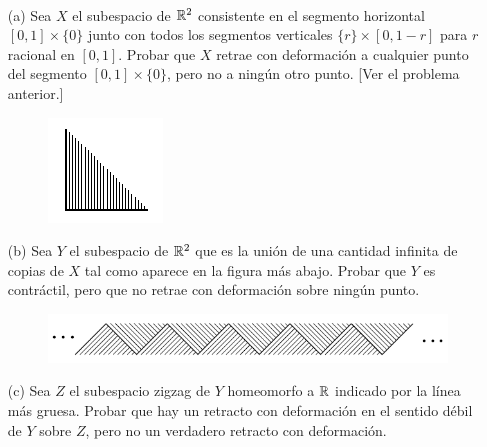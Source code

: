 \documentclass[twoside]{article}
\begin{document}
\begin{ejercicio}{0.6}\
\begin{enumerate}

\item[(a)] Sea $X$ el subespacio de $\mathbb{R}^2$ consistente en el segmento horizontal $[0,1]\times\{0\}$ junto con todos los segmentos verticales $\{r\}\times[0,1-r]$ para $r$ racional en $[0,1]$. Probar que $X$ retrae con deformación a cualquier punto del segmento $[0,1]\times\{0\}$, pero no a ningún otro punto. [Ver el problema anterior.]

\begin{figure}[h!]
\centering
\includegraphics[scale=0.9]{peine}
\end{figure}

\item[(b)] Sea $Y$ el subespacio de $\mathbb{R}^2$ que es la unión de una cantidad infinita de copias de $X$ tal como aparece en la figura más abajo. Probar que $Y$ es contráctil, pero que no retrae con deformación sobre ningún punto.
\begin{figure}[h!]
\centering
\includegraphics[scale=0.8]{peines}
\end{figure}

\item[(c)] Sea $Z$ el subespacio zigzag de $Y$ homeomorfo a $\mathbb{R}$ indicado por la línea más gruesa. Probar que hay un retracto con deformación en el sentido débil de $Y$ sobre $Z$, pero no un verdadero retracto con deformación. 
\end{enumerate}
\end{ejercicio}
\end{document}
